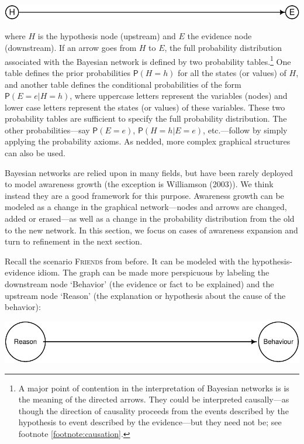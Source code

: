 \documentclass[
  11pt,
  dvipsnames,enabledeprecatedfontcommands]{scrartcl}
\newcommand{\pr}[1]{\ensuremath{\mathsf{P}(#1)}}
\begin{document}
\begin{center}\includegraphics[width=0.5\linewidth,height=0.5\textheight]{ReplyToSteeleStefansson5_files/figure-latex/heDAG-prel-1} \end{center}

\noindent where \(H\) is the hypothesis node (upstream) and \(E\) the
evidence node (downstream). If an arrow goes from \(H\) to \(E\), the
full probability distribution associated with the Bayesian network is
defined by two probability tables.\footnote{A major point of contention
  in the interpretation of Bayesian networks is is the meaning of the
  directed arrows. They could be interpreted causally---as though the
  direction of causality proceeds from the events described by the
  hypothesis to event described by the evidence---but they need not be;
  see footnote \ref{footnote:causation}.} One table defines the prior
probabilities \(\pr{H=h}\) for all the states (or values) of \(H\), and
another table defines the conditional probabilities of the form
\(\pr{E=e \vert H=h}\), where uppercase letters represent the variables
(nodes) and lower case letters represent the states (or values) of these
variables. These two probability tables are sufficient to specify the
full probability distribution. The other probabilities---say \pr{E=e},
\pr{H=h \vert E=e}, etc.---follow by simply applying the probability
axioms. As nedded, more complex graphical structures can also be used.

Bayesian networks are relied upon in many fields, but have been rarely
deployed to model awareness growth (the exception is Williamson (2003)).
We think instead they are a good framework for this purpose. Awareness
growth can be modeled as a change in the graphical network---nodes and
arrows are changed, added or erased---as well as a change in the
probability distribution from the old to the new network. In this
section, we focus on cases of awareness expansion and turn to refinement
in the next section.

Recall the scenario \textsc{Friends} from before. It can be modeled with
the hypothesis-evidence idiom. The graph can be made more perspicuous by
labeling the downstream node `Behavior' (the evidence or fact to be
explained) and the upstream node `Reason' (the explanation or hypothesis
about the cause of the behavior):

\begin{center}\includegraphics[width=0.5\linewidth,height=0.5\textheight]{ReplyToSteeleStefansson5_files/figure-latex/friendsDAG-1} \end{center}
\end{document}
